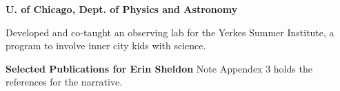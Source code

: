 \documentclass[12pt]{article}
\begin{document}
\ssp
\noindent
\makebox[1.25in][l]{}
{{\bf U. of Chicago, Dept. of Physics and Astronomy}}

\hfill
{}

\noindent
\makebox[1.25in][l]{}
\parbox[t]{5.40in}{Developed and co-taught an observing lab for the Yerkes Summer Institute, a program to involve inner city kids with science.} 


\vspace{0.2in}
\noindent
\newline
\newline
{\Large {\bf Selected Publications for Erin Sheldon} }
\newline
Note Appendex 3 holds the references for the narrative. 
\vspace{4mm}
\end{document}
